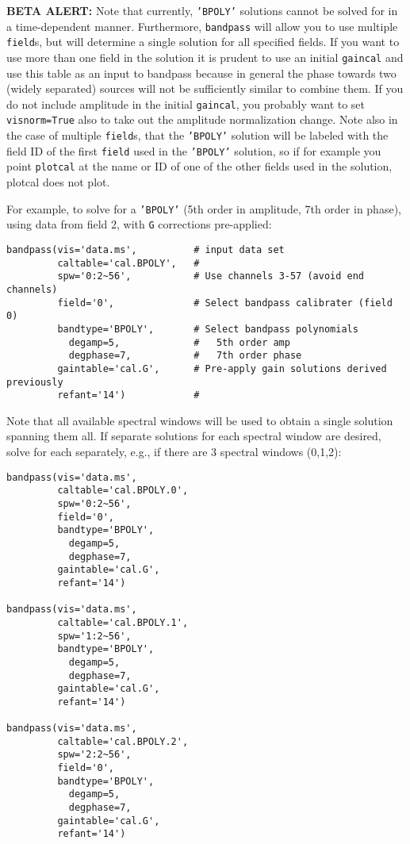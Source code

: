 {\bf BETA ALERT:} Note that currently, {\tt 'BPOLY'} solutions cannot
be solved for in a time-dependent manner.  Furthermore, {\tt bandpass}
will allow you to use multiple {\tt field}s, but will determine a single
solution for all specified fields. If you want to use more than one
field in the solution it is prudent to use an initial {\tt gaincal}
and use this table as an input to bandpass
because in general the phase towards two (widely separated) sources
will not be sufficiently similar to combine them.  If you do not
include amplitude in the initial {\tt gaincal}, you probably want
to set {\tt visnorm=True} also to take out the amplitude normalization
change.  Note also in 
the case of multiple {\tt field}s, that the {\tt 'BPOLY'} solution 
will be labeled with the field ID of the first {\tt field} used in
the {\tt 'BPOLY'} solution, so if for example you point {\tt plotcal} at the
name or ID of one of the other fields used in the solution, 
plotcal does not plot.

For example, to solve for a {\tt 'BPOLY'} (5th order in amplitude, 7th order
in phase), using data from field 2, with {\tt G} corrections pre-applied:
\small
\begin{verbatim}
bandpass(vis='data.ms',          # input data set
         caltable='cal.BPOLY',   #
         spw='0:2~56',           # Use channels 3-57 (avoid end channels)
         field='0',              # Select bandpass calibrater (field 0)
         bandtype='BPOLY',       # Select bandpass polynomials
           degamp=5,             #   5th order amp
           degphase=7,           #   7th order phase
         gaintable='cal.G',      # Pre-apply gain solutions derived previously
         refant='14')            #   
\end{verbatim}
\normalsize

Note that all available spectral windows will be used to obtain a
single solution spanning them all.  If separate solutions for each
spectral window are desired, solve for each separately, e.g., if there
are 3 spectral windows (0,1,2):
\small
\begin{verbatim}
bandpass(vis='data.ms',            
         caltable='cal.BPOLY.0',
         spw='0:2~56',
         field='0',
         bandtype='BPOLY',
           degamp=5,
           degphase=7, 
         gaintable='cal.G',
         refant='14')

bandpass(vis='data.ms',            
         caltable='cal.BPOLY.1',
         spw='1:2~56',
         bandtype='BPOLY',
           degamp=5,
           degphase=7, 
         gaintable='cal.G',
         refant='14')

bandpass(vis='data.ms',            
         caltable='cal.BPOLY.2',
         spw='2:2~56',
         field='0',
         bandtype='BPOLY',
           degamp=5,
           degphase=7, 
         gaintable='cal.G',
         refant='14')
\end{verbatim}
\normalsize

